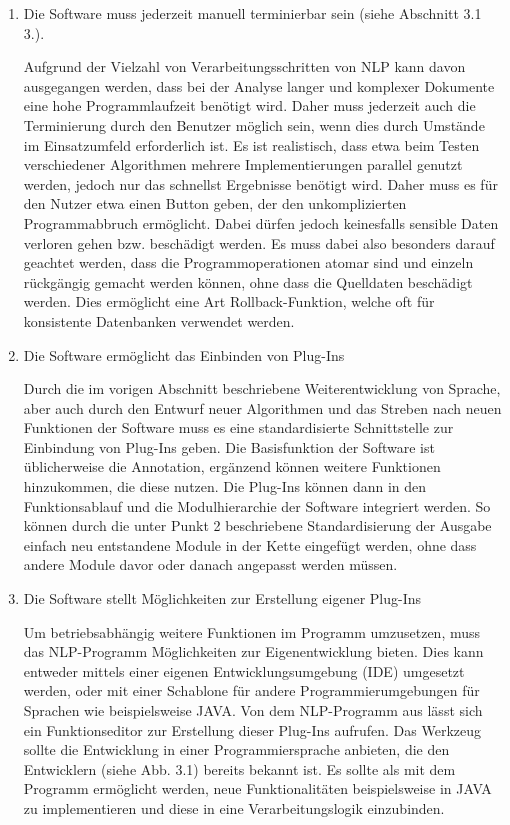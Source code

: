 \documentclass[12pt]{report}
\begin{document}
\begin{enumerate}
\item Die Software muss jederzeit manuell terminierbar sein (siehe Abschnitt 3.1 3.).

Aufgrund der Vielzahl von Verarbeitungsschritten von NLP kann davon ausgegangen werden, dass bei der Analyse langer und komplexer Dokumente eine hohe Programmlaufzeit benötigt wird. Daher muss jederzeit auch die Terminierung durch den Benutzer möglich sein, wenn dies durch Umstände im Einsatzumfeld erforderlich ist. Es ist realistisch, dass etwa beim Testen verschiedener Algorithmen mehrere Implementierungen parallel genutzt werden, jedoch nur das schnellst Ergebnisse benötigt wird. 
Daher muss es für den Nutzer etwa einen Button geben, der den unkomplizierten Programmabbruch ermöglicht. Dabei dürfen jedoch keinesfalls sensible Daten verloren gehen bzw. beschädigt werden. 
Es muss dabei also besonders darauf geachtet werden, dass die Programmoperationen atomar sind und einzeln rückgängig gemacht werden können, ohne dass die Quelldaten beschädigt werden. Dies ermöglicht eine Art Rollback-Funktion, welche oft für konsistente Datenbanken verwendet werden.

\item Die Software ermöglicht das Einbinden von Plug-Ins

Durch die im vorigen Abschnitt beschriebene Weiterentwicklung von Sprache, aber auch durch den Entwurf neuer Algorithmen und das Streben nach neuen Funktionen der Software muss es eine standardisierte Schnittstelle zur Einbindung von Plug-Ins geben. Die Basisfunktion der Software ist üblicherweise die Annotation, ergänzend können weitere Funktionen hinzukommen, die diese nutzen. Die Plug-Ins können dann in den Funktionsablauf und die Modulhierarchie der Software integriert werden. So können durch die unter Punkt 2 beschriebene Standardisierung der Ausgabe einfach neu entstandene Module in der Kette eingefügt werden, ohne dass andere Module davor oder danach angepasst werden müssen.

\item Die Software stellt Möglichkeiten zur Erstellung eigener Plug-Ins

Um betriebsabhängig weitere Funktionen im Programm umzusetzen, muss das NLP-Programm Möglichkeiten zur Eigenentwicklung bieten. Dies kann entweder mittels einer eigenen Entwicklungsumgebung (IDE) umgesetzt werden, oder mit einer Schablone für andere Programmierumgebungen für Sprachen wie beispielsweise JAVA. Von dem NLP-Programm aus lässt sich ein Funktionseditor zur Erstellung dieser Plug-Ins aufrufen. Das Werkzeug sollte die Entwicklung in einer Programmiersprache anbieten, die den Entwicklern (siehe Abb. 3.1) bereits bekannt ist. Es sollte als mit dem Programm ermöglicht werden, neue Funktionalitäten beispielsweise in JAVA zu implementieren und diese in eine Verarbeitungslogik einzubinden.


\end{enumerate}
\end{document}
